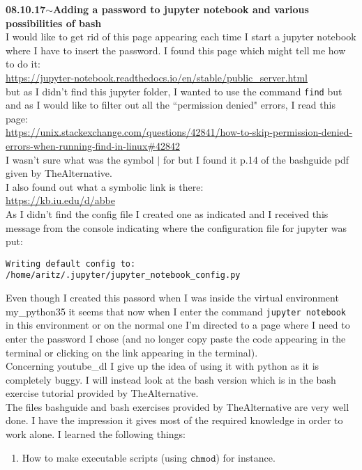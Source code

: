 \documentclass[11pt,a4paper]{article}
\newenvironment{loggentry}[2]%
{\noindent\textbf{#1}\hspace{1cm}$\mathbf{\sim}$\text{ }\textbf{#2}\\}{\vspace{0.5cm}}
\begin{document}
\begin{loggentry}{08.10.17}{Adding a password to jupyter notebook and various possibilities of bash}
I would like to get rid of this page appearing each time I start a jupyter notebook where I have to insert the password. I found this page which might tell me how to do it:\\
\url{https://jupyter-notebook.readthedocs.io/en/stable/public_server.html}\\
but as I didn't find this jupyter folder, I wanted to use the command \texttt{find} but and as I would like to filter out all the ``permission denied" errors, I read this page:\\
\url{https://unix.stackexchange.com/questions/42841/how-to-skip-permission-denied-errors-when-running-find-in-linux#42842}\\
I wasn't sure what was the symbol $|$ for but I found it p.14 of the bashguide pdf given by TheAlternative.\\
I also found out what a symbolic link is there:\\
\url{https://kb.iu.edu/d/abbe}\\
As I didn't find the config file I created one as indicated and I received this message from the console indicating where the configuration file for jupyter was put:
\begin{verbatim}
Writing default config to: /home/aritz/.jupyter/jupyter_notebook_config.py
\end{verbatim}
Even though I created this passord when I was inside the virtual environment my\_python35 it seems that now when I enter the command \texttt{jupyter notebook} in this environment or on the normal one I'm directed to a page where I need to enter the password I chose (and no longer copy paste the code appearing in the terminal or clicking on the link appearing in the terminal).\\
Concerning youtube\_dl I give up the idea of using it with python as it is completely buggy. I will instead look at the bash version which is in the bash exercise tutorial provided by TheAlternative.\\
The files bashguide and bash exercises provided by TheAlternative are very well done. I have the impression it gives most of the required knowledge in order to work alone. I learned the following things:\\
\begin{enumerate}
\item How to make executable scripts (using $\texttt{chmod}$) for instance.

\end{enumerate}
\end{loggentry}
\end{document}
